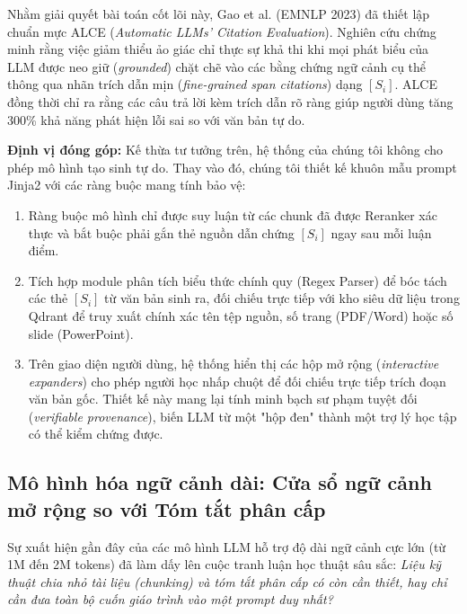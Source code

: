 ﻿\documentclass[12pt]{article}
\begin{document}
Nhằm giải quyết bài toán cốt lõi này, Gao et al. \cite{gao2023alce} (EMNLP 2023) đã thiết lập chuẩn mực ALCE (\textit{Automatic LLMs' Citation Evaluation}). Nghiên cứu chứng minh rằng việc giảm thiểu ảo giác chỉ thực sự khả thi khi mọi phát biểu của LLM được neo giữ (\textit{grounded}) chặt chẽ vào các bằng chứng ngữ cảnh cụ thể thông qua nhãn trích dẫn mịn (\textit{fine-grained span citations}) dạng $[S_i]$. ALCE đồng thời chỉ ra rằng các câu trả lời kèm trích dẫn rõ ràng giúp người dùng tăng 300\% khả năng phát hiện lỗi sai so với văn bản tự do.

\noindent \textbf{Định vị đóng góp:} Kế thừa tư tưởng trên, hệ thống của chúng tôi không cho phép mô hình tạo sinh tự do. Thay vào đó, chúng tôi thiết kế khuôn mẫu prompt Jinja2 với các ràng buộc mang tính bảo vệ:
\begin{enumerate}
    \item Ràng buộc mô hình chỉ được suy luận từ các chunk đã được Reranker xác thực và bắt buộc phải gắn thẻ nguồn dẫn chứng $[S_i]$ ngay sau mỗi luận điểm.
    \item Tích hợp module phân tích biểu thức chính quy (Regex Parser) để bóc tách các thẻ $[S_i]$ từ văn bản sinh ra, đối chiếu trực tiếp với kho siêu dữ liệu trong Qdrant để truy xuất chính xác tên tệp nguồn, số trang (PDF/Word) hoặc số slide (PowerPoint).
    \item Trên giao diện người dùng, hệ thống hiển thị các hộp mở rộng (\textit{interactive expanders}) cho phép người học nhấp chuột để đối chiếu trực tiếp trích đoạn văn bản gốc. Thiết kế này mang lại tính minh bạch sư phạm tuyệt đối (\textit{verifiable provenance}), biến LLM từ một "hộp đen" thành một trợ lý học tập có thể kiểm chứng được.
\end{enumerate}

\subsection{Mô hình hóa ngữ cảnh dài: Cửa sổ ngữ cảnh mở rộng so với Tóm tắt phân cấp}
Sự xuất hiện gần đây của các mô hình LLM hỗ trợ độ dài ngữ cảnh cực lớn (từ 1M đến 2M tokens) đã làm dấy lên cuộc tranh luận học thuật sâu sắc: \textit{Liệu kỹ thuật chia nhỏ tài liệu (chunking) và tóm tắt phân cấp có còn cần thiết, hay chỉ cần đưa toàn bộ cuốn giáo trình vào một prompt duy nhất?}
\end{document}
